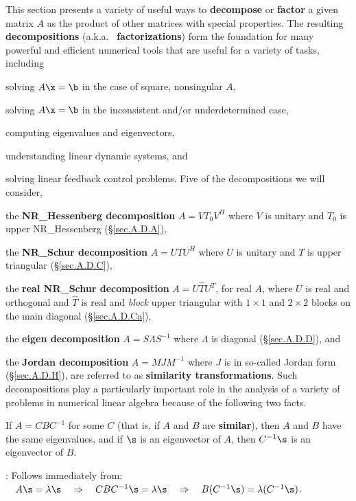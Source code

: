 This section presents a variety of useful ways to {\bf decompose} or
{\bf factor} a given matrix $A$ as the product of other matrices with
special properties.  The resulting {\bf decompositions} (a.k.a.~{\bf
factorizations}) form the foundation for many powerful and efficient
numerical tools that are useful for a variety of tasks, including
\beginmylistb
\item solving $A\x=\b$ in the case of square, nonsingular $A$,
\item solving $A\x=\b$ in the inconsistent and/or underdetermined case,
\item computing eigenvalues and eigenvectors,
\item understanding linear dynamic systems, and
\item solving linear feedback control problems.
\endmylist
Five of the decompositions we will consider,
\beginmylistb
\item the {\bf NR_Hessenberg decomposition} $A=V T_{0} V^{H}$ where $V$ is unitary and $T_0$ is upper NR_Hessenberg (\S \ref{sec.A.D.A}),
\item the {\bf NR_Schur decomposition} $A=UTU^{H}$ where $U$ is unitary and $T$ is upper triangular (\S \ref{sec.A.D.C}),
\item the {\bf real NR_Schur decomposition} $A=U{\hat T}U^{T}$, for real $A$, where $U$ is real and orthogonal and ${\hat T}$ is real and
{\it block} upper triangular with $1\times 1$ and $2\times 2$ blocks on the main diagonal (\S \ref{sec.A.D.Ca}),
\item the {\bf eigen decomposition} $A=S\Lambda S^{-1}$ where $\Lambda$ is diagonal (\S \ref{sec.A.D.D}), and
\item the {\bf Jordan decomposition} $A=MJM^{-1}$ where $J$ is in so-called Jordan form (\S \ref{sec.A.D.H}),
\endmylist
are referred to as {\bf similarity transformations}.  Such
decompositions play a particularly important role in the analysis of a
variety of problems in numerical linear algebra because of the
following two facts.\medskip

\begin{fact} \label{fact.A.D.A}
If $A=CBC^{-1}$ for some $C$ (that is, if $A$
and $B$ are {\bf similar}), then $A$ and $B$ have the same
eigenvalues, and if $\s$ is an eigenvector of $A$, then $C^{-1}\s$ is
an eigenvector of $B$.
\end{fact}

\/: Follows immediately from:
$\quad A\s=\lambda\s \quad \Rightarrow \quad CBC^{-1}\s=\lambda\s \quad \Rightarrow \quad B(C^{-1}\s)=\lambda(C^{-1}\s)$. \endproof

